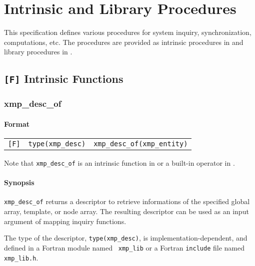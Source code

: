 \chapter{Intrinsic and Library Procedures}
\label{chap:Intrinsic and library procedures}

This specification defines various procedures for system inquiry,
synchronization, computations, etc. The procedures are provided as
intrinsic procedures in {\XMPF} and library procedures in {\XMPC}.

\section{{\tt [F]} Intrinsic Functions}

\subsection{xmp\_desc\_of}
\label{subsec: xmp_desc_of}

\subsubsection*{Format}

\begin{tabular}{lll}

\verb![F]!&  {\tt type(xmp\_desc)}& {\tt xmp\_desc\_of(xmp\_entity)}\\

\end{tabular}

\vspace{0.3cm}

Note that {\tt xmp\_desc\_of} is an intrinsic function in {\XMPF} or
a built-in operator in {\XMPC}.

\subsubsection*{Synopsis}

{\tt xmp\_desc\_of} returns a descriptor to retrieve informations of the
specified global array, template, or node array. The resulting
descriptor can be used as an input argument of mapping inquiry functions.

The type of the descriptor, {\tt type(xmp\_desc)}, is
implementation-dependent, and defined in a Fortran module named {\tt
xmp\_lib} or a Fortran {\tt include} file named {\tt xmp\_lib.h}.

